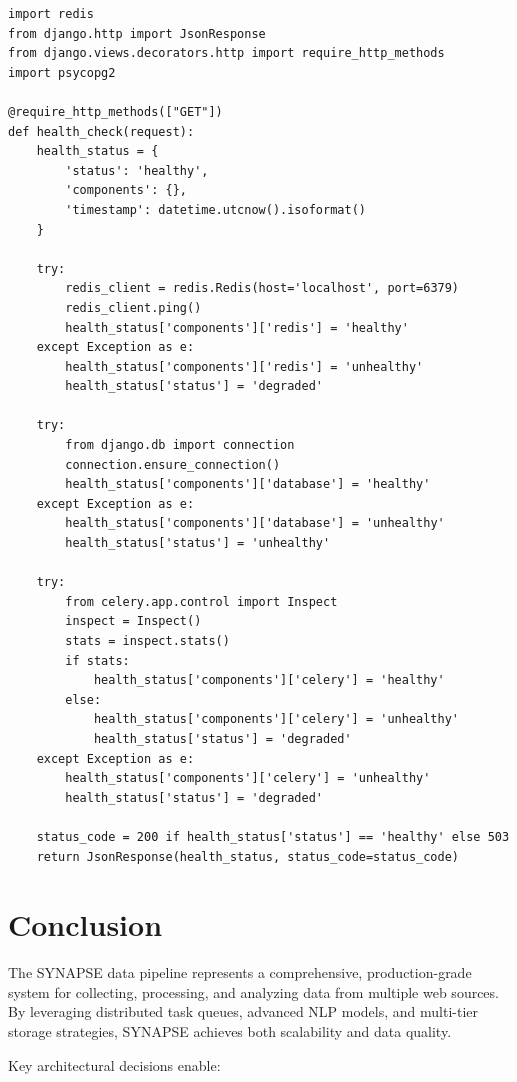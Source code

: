 \documentclass[12pt,a4paper]{report}
\begin{document}
\begin{lstlisting}
import redis
from django.http import JsonResponse
from django.views.decorators.http import require_http_methods
import psycopg2

@require_http_methods(["GET"])
def health_check(request):
    health_status = {
        'status': 'healthy',
        'components': {},
        'timestamp': datetime.utcnow().isoformat()
    }
    
    try:
        redis_client = redis.Redis(host='localhost', port=6379)
        redis_client.ping()
        health_status['components']['redis'] = 'healthy'
    except Exception as e:
        health_status['components']['redis'] = 'unhealthy'
        health_status['status'] = 'degraded'
    
    try:
        from django.db import connection
        connection.ensure_connection()
        health_status['components']['database'] = 'healthy'
    except Exception as e:
        health_status['components']['database'] = 'unhealthy'
        health_status['status'] = 'unhealthy'
    
    try:
        from celery.app.control import Inspect
        inspect = Inspect()
        stats = inspect.stats()
        if stats:
            health_status['components']['celery'] = 'healthy'
        else:
            health_status['components']['celery'] = 'unhealthy'
            health_status['status'] = 'degraded'
    except Exception as e:
        health_status['components']['celery'] = 'unhealthy'
        health_status['status'] = 'degraded'
    
    status_code = 200 if health_status['status'] == 'healthy' else 503
    return JsonResponse(health_status, status_code=status_code)
\end{lstlisting}

\chapter{Conclusion}

The SYNAPSE data pipeline represents a comprehensive, production-grade system for collecting, processing, and analyzing data from multiple web sources. By leveraging distributed task queues, advanced NLP models, and multi-tier storage strategies, SYNAPSE achieves both scalability and data quality.

Key architectural decisions enable:
\end{document}
